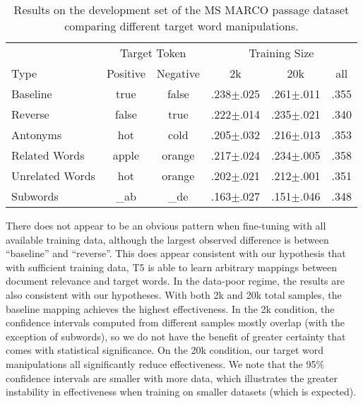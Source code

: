 \documentclass{article}
\begin{document}
\begin{table}[t]
    \centering
    \begin{tabular}{l|c|c|c|c|c}
        & \multicolumn{2}{c|}{Target Token} & \multicolumn{3}{c}{Training Size} \\
        Type & Positive & Negative & 2k & 20k & all \\
    \toprule
    Baseline & true & false & .238$\pm${.025} & .261$\pm${.011} & .355 \\
    \midrule
    Reverse & false & true & .222$\pm${.014} & .235$\pm${.021} & .340 \\
    Antonyms & hot & cold & .205$\pm${.032} & .216$\pm${.013} & .353 \\
    Related Words & apple & orange & .217$\pm${.024} & .234$\pm${.005} & .358 \\
    Unrelated Words & hot & orange & .202$\pm${.021} & .212$\pm${.001} & .351 \\
    Subwords & \_ab & \_de & .163$\pm${.027} & .151$\pm${.046} & .348 \\
    \bottomrule
    \end{tabular}
    \vspace{2mm}
    \caption{Results on the development set of the MS MARCO passage dataset comparing different target word manipulations.}
    \label{tab:analysis}
\end{table}

There does not appear to be an obvious pattern when fine-tuning with all available training data, although the largest observed difference is between ``baseline'' and ``reverse''.
This does appear consistent with our hypothesis that with sufficient training data, T5 is able to learn arbitrary mappings between document relevance and target words.
In the data-poor regime, the results are also consistent with our hypotheses.
With both 2k and 20k total samples, the baseline mapping achieves the highest effectiveness.
In the 2k condition, the confidence intervals computed from different samples mostly overlap (with the exception of subwords), so we do not have the benefit of greater certainty that comes with statistical significance.
On the 20k condition, our target word manipulations all significantly reduce effectiveness.
We note that the 95\% confidence intervals are smaller with more data, which illustrates the greater instability in effectiveness when training on smaller datasets (which is expected).
\end{document}

